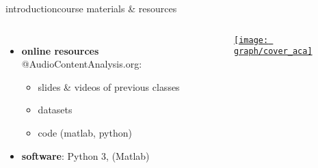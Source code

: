 \begin{frame}{introduction}{course materials \& resources}
\begin{columns}[T]
\begin{itemize}
                        \smallskip
                        \item<3->   \textbf{online resources} @AudioContentAnalysis.org: 
                            \begin{itemize}
                                \item   slides \& videos of previous classes
                                \item   datasets
                                \item    code (matlab, python)
                            \end{itemize}
                        \smallskip
                        \item<4->   \textbf{software}: Python 3, (Matlab)
                    \end{itemize}
                     \href{https://ieeexplore.ieee.org/servlet/opac?bknumber=6266785}{\texttt{[image: graph/cover\_aca]}}
                    \vspace{40mm}
             \end{columns}
       \end{frame}

